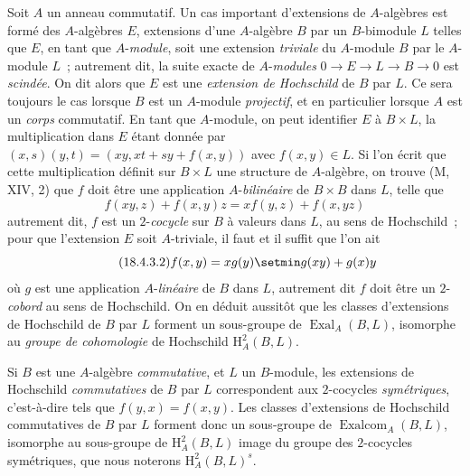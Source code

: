 \begin{env}[18.4.3]
\label{0.18.4.3-fr}
Soit $A$ un anneau commutatif. Un cas important d'extensions de
$A$-algèbres est formé des $A$-algèbres $E$, extensions d'une $A$-algèbre $B$
par un $B$-bimodule $L$ telles que $E$, en tant que $A$-\emph{module}, soit une
extension \emph{triviale} du $A$-module $B$ par le $A$-module $L$~; autrement
dit, la suite exacte de $A$-\emph{modules}
$0\to E\to L\to B\to0$ est \emph{scindée}. On dit alors que $E$ est une
\emph{extension de Hochschild} de $B$ par $L$. Ce sera toujours le cas lorsque
$B$ est un $A$-module \emph{projectif}, et en particulier lorsque $A$ est un
\emph{corps} commutatif. En tant que $A$-module, on peut identifier $E$ à
$B\times L$, la multiplication dans $E$ étant donnée par
$(x,s)(y,t)=(xy,xt+sy+f(x,y))$ avec $f(x,y)\in L$. Si l'on écrit que cette
multiplication définit sur $B\times L$ une structure de $A$-algèbre, on trouve
(M, XIV, 2) que $f$ doit être une application $A$-\emph{bilinéaire} de
$B\times B$ dans $L$, telle que
\begin{equation}
\label{0.18.4.3.1-fr}
\tag{18.4.3.1}
  f(xy,z)+f(x,y)z=xf(y,z)+f(x,yz)
\end{equation}
autrement dit, $f$ est un $2$-\emph{cocycle} sur $B$ à valeurs dans $L$, au
sens de Hochschild~; pour que l'extension $E$ soit $A$-triviale, il faut et il
suffit que l'on ait
\begin{equation}
\label{0.18.4.3.2-fr}
\tag{18.4.3.2}
  f(x,y)=xg(y)\setmin g(xy)+g(x)y
\end{equation}
où $g$ est une application $A$-\emph{linéaire} de $B$ dans $L$, autrement dit
$f$ doit être un $2$-\emph{cobord} au sens de Hochschild. On en déduit aussitôt
que les classes d'extensions de Hochschild de $B$ par $L$ forment un
sous-groupe de $\operatorname{Exal}_A(B,L)$, isomorphe au \emph{groupe de
cohomologie} de Hochschild $\mathrm H_A^2(B,L)$.

Si $B$ est une $A$-algèbre \emph{commutative}, et $L$ un $B$-module, les
extensions de Hochschild \emph{commutatives} de $B$ par $L$ correspondent aux
$2$-cocycles \emph{symétriques}, c'est-à-dire tels que $f(y,x)=f(x,y)$. Les
classes d'extensions de Hochschild commutatives de $B$ par $L$ forment donc un
sous-groupe de $\operatorname{Exalcom}_A(B,L)$, isomorphe au sous-groupe de
$\mathrm H_A^2(B,L)$ image du groupe des $2$-cocycles symétriques, que nous
noterons $\mathrm H_A^2(B,L)^s$.
\end{env}

